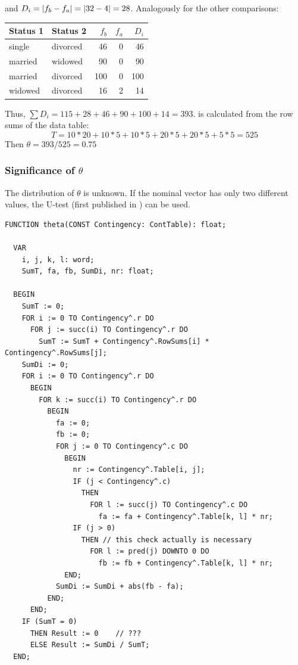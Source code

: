 \begin{refsection}
and \(D_i = |f_b - f_a| = |32 - 4| = 28 \).  Analogously for the other comparisons:

\begin{tabular}{llrrr}
  \toprule
  Status 1 & Status 2 & \(f_b \) & \(f_a \) & \(D_i \) \\
  \midrule
  single   & divorced &  46   & 0 &  46 \\
  married  & widowed  &  90   & 0 &  90 \\
  married  & divorced & 100   & 0 & 100 \\
  widowed  & divorced &  16   & 2 &  14 \\
  \bottomrule
\end{tabular}

Thus, \(\sum{D_i} = 115 + 28 + 46 + 90 + 100 + 14 = 393 \).  is calculated from the row sums of the data table:
\begin{equation}
  T = 10*20 + 10*5 + 10*5 + 20*5 + 20*5 + 5*5 = 525
\end{equation}
Then \(\theta = 393/525 = 0.75 \)

\subsubsection{Significance of \(\theta \)}

The distribution of \(\theta \) is unknown. If the nominal vector has only two different values, the  U-test (first published in \parencite{Deu-14}) can be used.

\begin{lstlisting}[caption=\Name{Freeman}'s measure of association \skalar{\theta}]
  FUNCTION theta(CONST Contingency: ContTable): float;

  VAR
    i, j, k, l: word;
    SumT, fa, fb, SumDi, nr: float;

  BEGIN
    SumT := 0;
    FOR i := 0 TO Contingency^.r DO
      FOR j := succ(i) TO Contingency^.r DO
        SumT := SumT + Contingency^.RowSums[i] * Contingency^.RowSums[j];
    SumDi := 0;
    FOR i := 0 TO Contingency^.r DO
      BEGIN
        FOR k := succ(i) TO Contingency^.r DO
          BEGIN
            fa := 0;
            fb := 0;
            FOR j := 0 TO Contingency^.c DO
              BEGIN
                nr := Contingency^.Table[i, j];
                IF (j < Contingency^.c)
                  THEN
                    FOR l := succ(j) TO Contingency^.c DO
                      fa := fa + Contingency^.Table[k, l] * nr;
                IF (j > 0)
                  THEN // this check actually is necessary
                    FOR l := pred(j) DOWNTO 0 DO
                      fb := fb + Contingency^.Table[k, l] * nr;
              END;
            SumDi := SumDi + abs(fb - fa);
          END;
      END;
    IF (SumT = 0)
      THEN Result := 0    // ???
      ELSE Result := SumDi / SumT;
  END;
\end{lstlisting}



\end{refsection}
